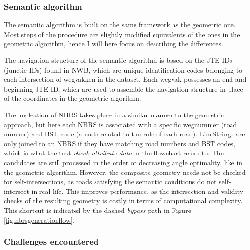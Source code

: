 \subsubsection{Semantic algorithm}

The semantic algorithm is built on the same framework as the geometric one. Most steps of the procedure are slightly modified equivalents of the ones in the geometric algorithm, hence I will here focus on describing the differences.

The navigation structure of the semantic algorithm is based on the JTE IDs (junctie IDs) found in NWB, which are unique identification codes belonging to each intersection of wegvakken in the dataset. Each wegvak possesses an end and beginning JTE ID, which are used to assemble the navigation structure in place of the coordinates in the geometric algorithm.

The nucleation of NBRS takes place in a similar manner to the geometric approach, but here each NBRS is associated with a specific wegnummer (road number) and BST code (a code related to the role of each road). LineStrings are only joined to an NBRS if they have matching road numbers and BST codes, which is what the text \textit{check attribute data} in the flowchart refers to. The candidates are still processed in the order or decreasing angle optimality, like in the geometric algorithm. However, the composite geometry needs not be checked for self-intersections, as roads satisfying the semantic conditions do not self-intersect in real life. This improves performance, as the intersection and validity checks of the resulting geometry is costly in terms of computational complexity. This shortcut is indicated by the dashed \textit{bypass} path in Figure \ref{fig:nbrsgenerationflow}.

\subsubsection{Challenges encountered}

